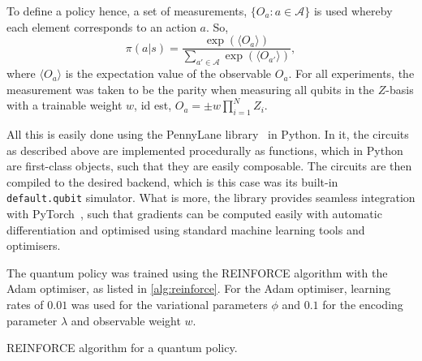 To define a policy hence, a set of measurements, $\{O_a : a \in \mathcal{A}\}$ is used whereby each element corresponds to an action $a$.
So,
\begin{equation}
    \pi(a|s) = \frac{\exp\left(\langle O_a \rangle\right)}{\sum_{a' \in \mathcal{A}} \exp\left(\langle O_{a'} \rangle\right)},
\end{equation}
where $\langle O_a \rangle$ is the expectation value of the observable $O_a$.
For all experiments, the measurement was taken to be the parity when measuring all qubits in the $Z$-basis with a trainable weight $w$, id est, $O_a = \pm w \prod_{i=1}^N Z_i$.

All this is easily done using the PennyLane library~\autocite{pennylane} in Python.
In it, the circuits as described above are implemented procedurally as functions, which in Python are first-class objects, such that they are easily composable.
The circuits are then compiled to the desired backend, which is this case was its built-in \texttt{default.qubit} simulator.
What is more, the library provides seamless integration with PyTorch~\autocite{pytorch}, such that gradients can be computed easily with automatic differentiation and optimised using standard machine learning tools and optimisers.

The quantum policy was trained using the REINFORCE algorithm with the Adam optimiser, as listed in \cref{alg:reinforce}.
For the Adam optimiser, learning rates of $0.01$ was used for the variational parameters $\phi$ and $0.1$ for the encoding parameter $\lambda$ and observable weight $w$.

\begin{algorithm}
    \SetAlgoLined
    \caption{REINFORCE algorithm for a quantum policy.}
    \label{alg:reinforce}
\end{algorithm}